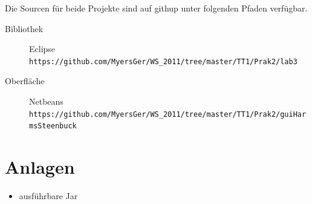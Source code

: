 \documentclass[10pt]{scrartcl}
\begin{document}
Die Sourcen für beide Projekte sind auf githup unter folgenden Pfaden verfügbar.
\begin{description}
	\item[Bibliothek] Eclipse \\ \verb!https://github.com/MyersGer/WS_2011/tree/master/TT1/Prak2/lab3!
	\item[Oberfläche] Netbeans \\ \verb!https://github.com/MyersGer/WS_2011/tree/master/TT1/Prak2/guiHarmsSteenbuck!
\end{description}

\section{Anlagen}
\begin{itemize}
	\item ausführbare Jar
\end{itemize}
\end{document}
